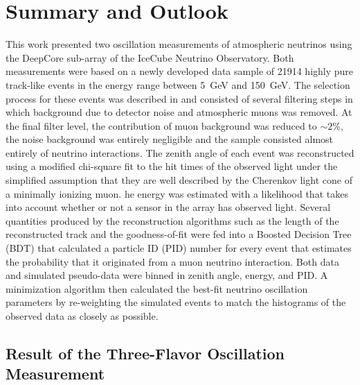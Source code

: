 \setchapterpreamble[u]{\margintoc}
\chapter{Summary and Outlook}

\label{sec:summary}

This work presented two oscillation measurements of atmospheric neutrinos using the DeepCore sub-array of the IceCube Neutrino Observatory. Both measurements were based on a newly developed data sample of \num{21914} highly pure track-like events in the energy range between \SI{5}{\giga\electronvolt} and \SI{150}{\giga\electronvolt}. The selection process for these events was described in  and consisted of several filtering steps in which background due to detector noise and atmospheric muons was removed. At the final filter level, the contribution of muon background was reduced to $\sim2\%$, the noise background was entirely negligible and the sample consisted almost entirely of neutrino interactions. The zenith angle of each event was reconstructed using a modified chi-square fit to the hit times of the observed light under the simplified assumption that they are well described by the Cherenkov light cone of a minimally ionizing muon. he energy was estimated with a likelihood that takes into account whether or not a sensor in the array has observed light. %
Several quantities produced by the reconstruction algorithms such as the length of the reconstructed track and the goodness-of-fit were fed into a Boosted Decision Tree (BDT) that calculated a particle ID (PID) number for every event that estimates the probability that it originated from a muon neutrino interaction. Both data and simulated pseudo-data were binned in zenith angle, energy, and PID. A minimization algorithm then calculated the best-fit neutrino oscillation parameters by re-weighting the simulated events to match the histograms of the observed data as closely as possible.

\section{Result of the Three-Flavor Oscillation Measurement}
\label{sec:summary-three-flavor}

